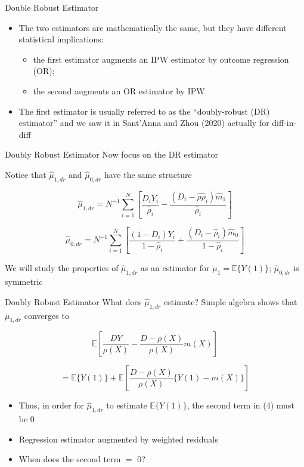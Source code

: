 \documentclass{beamer}
\begin{document}
\begin{frame}{Double Robust Estimator}

\begin{itemize}

\item     The two estimators are mathematically the same, but they have different statistical implications:
    	\begin{itemize}
	\item  the first estimator augments an IPW estimator by outcome regression (OR); 
	\item the second augments an OR estimator by IPW.
	\end{itemize}
\item The first estimator is usually referred to as the ``doubly-robust (DR) estimator'' and we saw it in Sant'Anna and Zhou (2020) actually for diff-in-diff

\end{itemize}
\end{frame}


\begin{frame}{Doubly Robust Estimator}
    Now focus on the DR estimator

    Notice that \( \hat{\mu}_{1,dr} \) and \( \hat{\mu}_{0,dr} \) have the same structure

    \[
    \hat{\mu}_{1,dr} = N^{-1} \sum_{i=1}^{N} \left[ \frac{D_iY_i}{\hat{\rho}_i} - \frac{(D_i - \hat{\rho\rho}_i)\hat{m}_1}{\hat{\rho}_i} \right]
    \]

    \[
    \hat{\mu}_{0,dr} = N^{-1} \sum_{i=1}^{N} \left[ \frac{(1 - D_i)Y_i}{1 - \hat{\rho}_i} + \frac{(D_i - \hat{\rho}_i)\hat{m}_0}{1 - \hat{\rho}_i} \right]
    \]

    We will study the properties of \( \hat{\mu}_{1,dr} \) as an estimator for \( \mu_1 = \mathbb{E}\{Y(1)\} \); \( \hat{\mu}_{0,dr} \) is symmetric
\end{frame}




\begin{frame}{Doubly Robust Estimator}
    What does \( \hat{\mu}_{1,dr} \) estimate? Simple algebra shows that \( \mu_{1, dr} \) converges to

    \[
    \mathbb{E}\left[ \frac{DY}{\rho(X)} - \frac{D - \rho(X)}{\rho(X)}m(X) \right]
    \]

    \[
    = \mathbb{E}\{Y(1)\} + \mathbb{E}\left[ \frac{D - \rho(X)}{\rho(X)}\{Y(1) - m(X)\} \right]
    \]


\begin{itemize}
\item     Thus, in order for \( \hat{\mu}_{1,dr} \) to estimate \( \mathbb{E}\{Y(1)\} \), the second term in (4) must be 0

\item     Regression estimator augmented by weighted residuals

\item     When does the second term $=$ 0?

\end{itemize}
\end{frame}
\end{document}
